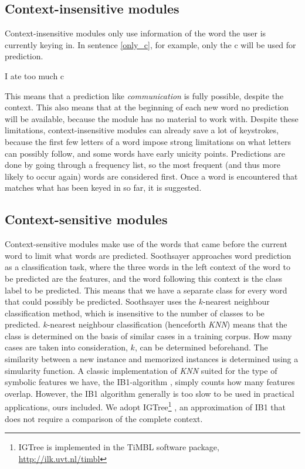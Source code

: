 \documentclass[11pt]{article}
\begin{document}
\subsection{Context-insensitive modules} \label{ci}

Context-insensitive modules only use information of the word the user is currently keying in. In sentence \ref{only_c}, for example, only the c will be used for prediction. 

\begin{examples}
\item I ate too much c \label{only_c}
\end{examples}

This means that a prediction like \emph{communication} is fully possible, despite the context. This also means that at the beginning of each new word no prediction will be available, because the module has no material to work with. Despite these limitations, context-insensitive modules can already save a lot of keystrokes, because the first few letters of a word impose strong limitations on what letters can possibly follow, and some words have early unicity points. Predictions are done by going through a frequency list, so the most frequent (and thus more likely to occur again) words are considered first. Once a word is encountered that matches what has been keyed in so far, it is suggested.

\subsection{Context-sensitive modules} \label{cs}

Context-sensitive modules make use of the words that came before the current word to limit what words are predicted. Soothsayer approaches word prediction as a classification task, where the three words in the left context of the word to be predicted are the features, and the word following this context is the class label to be predicted. This means that we have a separate class for every word that could possibly be predicted. Soothsayer uses the $k$-nearest neighbour classification method, which is insensitive to the number of classes to be predicted. $k$-nearest neighbour classification (henceforth \emph{KNN}) means that the class is determined on the basis of similar cases in a training corpus. How many cases are taken into consideration, $k$, can be determined beforehand. The similarity between a new instance and memorized instances is determined using a simularity function.  A classic implementation of \emph{KNN} suited for the type of symbolic features we have, the IB1-algorithm \cite{aha+91}, simply counts how many features overlap. However, the IB1 algorithm generally is too slow to be used in practical applications, ours included. We adopt IGTree\footnote{IGTree is implemented in the TiMBL software package, \url{http://ilk.uvt.nl/timbl}} \cite{daelemans+97}, an approximation of IB1 that does not require a comparison of the complete context.
\end{document}
